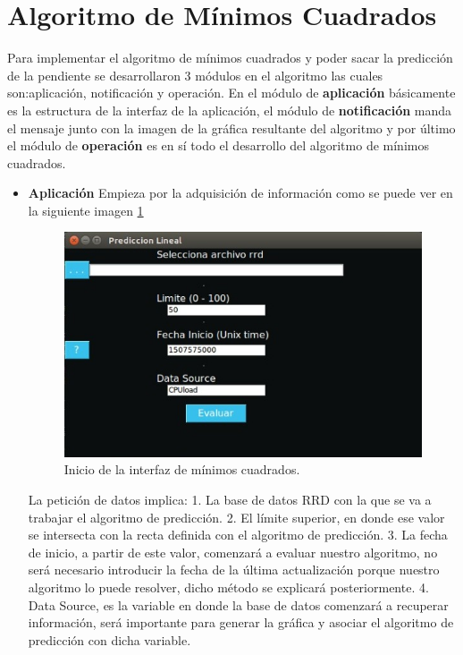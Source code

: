 \newpage
\section{Algoritmo de Mínimos Cuadrados}
Para implementar el algoritmo de mínimos cuadrados y poder sacar la predicción de la pendiente se desarrollaron 3 módulos en el algoritmo las cuales son:aplicación, notificación y operación.
En el módulo de \textbf{aplicación} básicamente es la estructura de la interfaz de la aplicación, el módulo de \textbf{notificación} manda el mensaje junto con la imagen de la gráfica resultante del algoritmo y por último el módulo de \textbf{operación} es en sí todo el desarrollo del algoritmo de mínimos cuadrados.

\begin{itemize}
\item \textbf{Aplicación}
Empieza por la adquisición de información como se puede ver en la siguiente imagen         \ref{image:1}

\FloatBarrier
\begin{figure}[htbp!]
		\centering
		    \includegraphics[width=.6 \textwidth]{../images/1.jpeg}
		\caption{Inicio de la interfaz de mínimos cuadrados.}
		\label{image:1}
\end{figure}
\FloatBarrier

La petición de datos implica:
1. La base de datos RRD con la que se va a trabajar el algoritmo de predicción.
2. El límite superior, en donde ese valor se intersecta con la recta definida con el algoritmo de predicción.
3. La fecha de inicio, a partir de este valor, comenzará a evaluar nuestro algoritmo, no será necesario introducir la fecha de la última actualización porque nuestro algoritmo lo puede resolver, dicho método se explicará posteriormente.
4. Data Source, es la variable en donde la base de datos comenzará a recuperar información, será importante para generar la gráfica y asociar el algoritmo de predicción con dicha variable.


\end{itemize}
